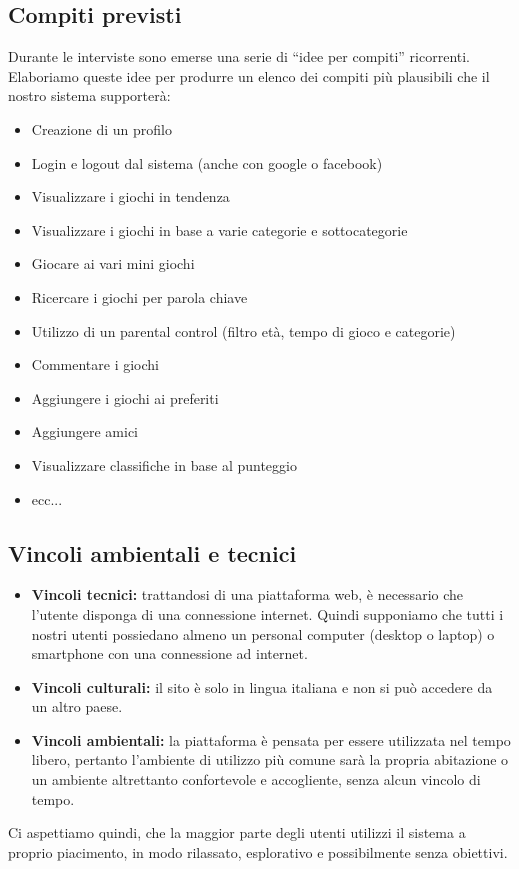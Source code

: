 \documentclass[../Report.tex]{subfiles}
\begin{document}
        \subsection{Compiti previsti}
        Durante le interviste sono emerse una serie di “idee per compiti” ricorrenti. Elaboriamo queste idee per produrre un elenco dei compiti più plausibili che il nostro sistema supporterà:
        \begin{itemize}
            \item Creazione di un profilo
            \item Login e logout dal sistema (anche con google o facebook)
            \item Visualizzare i giochi in tendenza
            \item Visualizzare i giochi in base a varie categorie e sottocategorie
            \item Giocare ai vari mini giochi
            \item Ricercare i giochi per parola chiave
            \item Utilizzo di un parental control (filtro età, tempo di gioco e categorie)
            \item Commentare i giochi
            \item Aggiungere i giochi ai preferiti
            \item Aggiungere amici
            \item Visualizzare classifiche in base al punteggio
            \item ecc...
        \end{itemize}

        \subsection{Vincoli ambientali e tecnici}
        \begin{itemize}
            \item \textbf{Vincoli tecnici:} trattandosi di una piattaforma web, è necessario che l'utente disponga di una connessione internet. Quindi supponiamo che tutti i nostri utenti possiedano almeno un personal computer (desktop o laptop) o smartphone con una connessione ad internet.
            \item \textbf{Vincoli culturali:} il sito è solo in lingua italiana e non si può accedere da un altro paese.
            \item \textbf{Vincoli ambientali:} la piattaforma è pensata per essere utilizzata nel tempo libero, pertanto l'ambiente di utilizzo più comune sarà la propria abitazione o un ambiente altrettanto confortevole e accogliente, senza alcun vincolo di tempo.
        \end{itemize}
        Ci aspettiamo quindi, che la maggior parte degli utenti utilizzi il sistema a proprio piacimento, in modo rilassato, esplorativo e possibilmente senza obiettivi.
\end{document}
